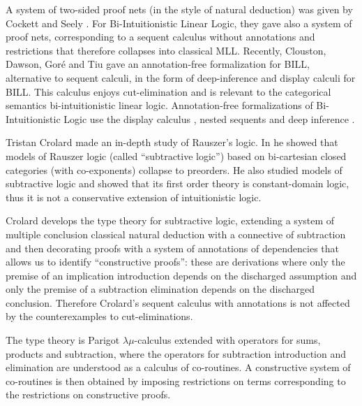\documentclass{lmcs}
\begin{document}
A system of two-sided proof nets (in the style of natural deduction)
was given by Cockett and Seely \cite{Cockett:1997}.  For
Bi-Intuitionistic Linear Logic, they gave also a system of proof nets,
corresponding to a sequent calculus without annotations and
restrictions that therefore collapses into classical MLL.  Recently,
Clouston, Dawson, Goré and Tiu \cite{CloustonDGT:2013} gave an 
annotation-free formalization for BILL, alternative to sequent calculi, 
in the form of deep-inference and display calculi for BILL. This calculus 
enjoys cut-elimination and is relevant to the categorical semantics
bi-intuitionistic linear logic. Annotation-free formalizations of 
Bi-Intuitionistic Logic use the display calculus \cite{Gore:2000}, nested sequents
\cite{GorePT:2008} and deep inference \cite{Postniece:2009}.
 

Tristan Crolard \cite{Crolard:2001,Crolard:2004} made an in-depth
study of Rauszer's logic. In \cite{Crolard:2001} he showed that models
of Rauszer logic (called ``subtractive logic'') based on bi-cartesian
closed categories (with co-exponents) collapse to preorders.  He also
studied models of subtractive logic and showed that its first order
theory is constant-domain logic, thus it is not a conservative
extension of intuitionistic logic.

Crolard \cite{Crolard:2004} develops the type theory for subtractive
logic, extending a system of multiple conclusion classical natural
deduction with a connective of subtraction and then decorating proofs
with a system of annotations of dependencies that allows us to
identify ``constructive proofs'': these are derivations where only the
premise of an implication introduction depends on the discharged
assumption and only the premise of a subtraction elimination depends
on the discharged conclusion. Therefore Crolard's sequent calculus
with annotations is not affected by the counterexamples to
cut-eliminations.

The type theory is Parigot $\lambda\mu$-calculus extended with
operators for sums, products and subtraction, where the operators for
subtraction introduction and elimination are understood as a calculus
of co-routines.  A constructive system of co-routines is then obtained
by imposing restrictions on terms corresponding to the restrictions on
constructive proofs.  
\end{document}
